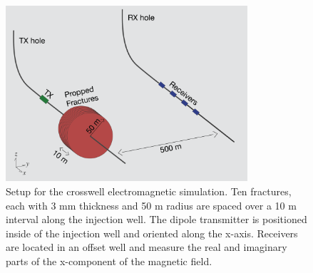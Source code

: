 \begin{figure}
    \begin{center}
    \includegraphics[width=0.8\textwidth]{figures/phys_prop_model/crosswell_fractures.png}
    \end{center}
\caption{
    Setup for the crosswell electromagnetic simulation. Ten fractures, each with 3 mm thickness
    and 50 m radius are spaced over a 10 m interval along the injection well. The dipole transmitter
    is positioned inside of the injection well and oriented along the x-axis. Receivers are located
    in an offset well and measure the real and imaginary parts of the x-component of the magnetic field.
}
\label{fig:crosswell_fractures}
\end{figure}
